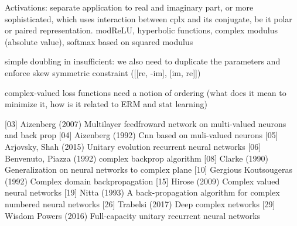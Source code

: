 Activations: separate application to real and imaginary part, or more sophisticated, which uses
interaction between cplx and its conjugate, be it polar or paired representation. modReLU, hyperbolic
functions, complex modulus (absolute value), softmax based on squared modulus

simple doubling in insufficient: we also need to duplicate the parameters and enforce skew symmetric
constraint ([[re, -im], [im, re]])

complex-valued loss functions need a notion of ordering (what does it mean to minimize it,
how is it related to ERM and stat learning)


[03] Aizenberg (2007) Multilayer feedfroward network on multi-valued neurons and back prop
[04] Aizenberg (1992) Cnn based on muli-valued neurons 
[05] Arjovsky, Shah (2015) Unitary evolution recurrent neural networks
[06] Benvenuto, Piazza (1992) complex backprop algorithm
[08] Clarke (1990) Generalization on neural networks to complex plane
[10] Gergious Koutsougeras (1992) Complex domain backpropagation
[15] Hirose (2009) Complex valued neural networks
[19] Nitta (1993) A back-propagation algorithm for complex numbered neural networks
[26] Trabelsi (2017) Deep complex networks
[29] Wisdom Powers (2016) Full-capacity unitary recurrent neural networks
